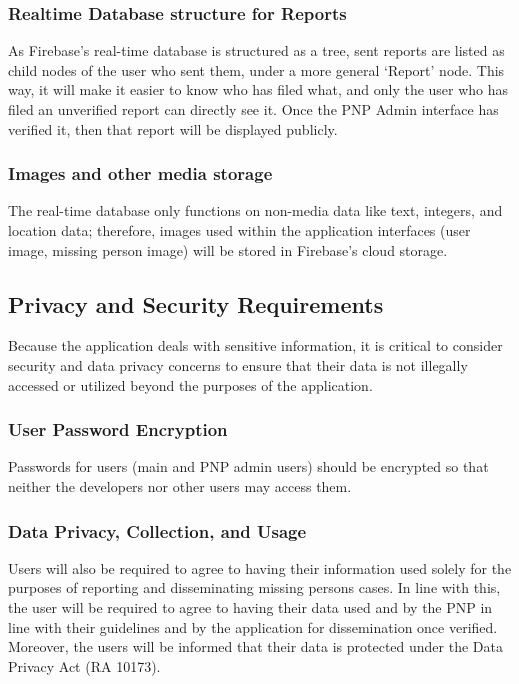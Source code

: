 \subsubsection{Realtime Database structure for Reports}
As Firebase’s real-time database is structured as a tree, sent reports are listed as child nodes of the user who sent them, under a more general `Report' node. This way, it will make it easier to know who has filed what, and only the user who has filed an unverified report can directly see it. Once the PNP Admin interface has verified it, then that report will be displayed publicly.

\subsubsection{Images and other media storage}
The real-time database only functions on non-media data like text, integers, and location data; therefore, images used within the application interfaces (user image, missing person image) will be stored in Firebase’s cloud storage. 



\subsection{Privacy and Security Requirements}

Because the application deals with sensitive information, it is critical to consider security and data privacy concerns to ensure that their data is not illegally accessed or utilized beyond the purposes of the application.

\subsubsection{User Password Encryption}

Passwords for users (main and PNP admin users) should be encrypted so that neither the developers nor other users may access them. 

\subsubsection{Data Privacy, Collection, and Usage}

Users will also be required to agree to having their information used solely for the purposes of reporting and disseminating missing persons cases. In line with this, the user will be required to agree to having their data used and by the PNP in line with their guidelines and by the application for dissemination  once verified. Moreover, the users will be informed that their data is protected under the Data Privacy Act (RA 10173).

